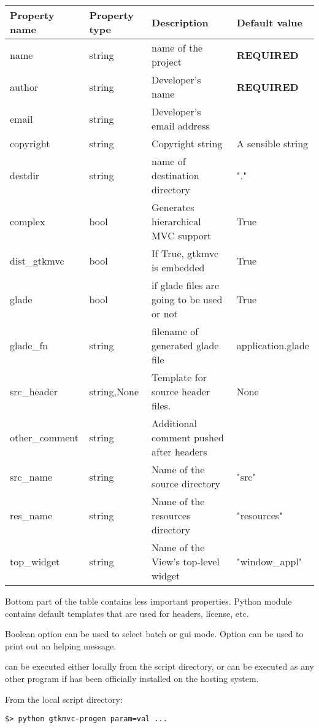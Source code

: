 \begin{center}
\begin{tabular}{|l|l|l|l|}
\hline
Property name& Property type & Description & Default value\\[0.5ex]
\hline
name & string & name of the project & \textbf{REQUIRED} \\
author & string & Developer's name & \textbf{REQUIRED} \\
email & string & Developer's email address & \\
copyright & string & Copyright string & A sensible string\\
destdir & string & name of destination directory & "." \\
complex & bool & Generates hierarchical MVC support & True \\
dist\_gtkmvc & bool & If True, gtkmvc is embedded & True \\
glade & bool & if glade files are going to be used or not & True \\
\hline
glade\_fn & string & filename of generated glade file & application.glade \\
src\_header & string,None & Template for source header files. & None \\
other\_comment & string & Additional comment pushed after headers &  \\ 
src\_name & string & Name of the source directory & "src" \\
res\_name & string & Name of the resources directory & "resources" \\
top\_widget & string & Name of the View's top-level widget & "window\_appl" \\
\hline
\end{tabular} 
\end{center}

Bottom part of the table contains less important properties. Python
module  contains default templates that
are used for headers, license, etc. 

Boolean option  can be used to select batch or gui
mode. Option  can be used to print out an helping message.

\bigskip

 can be executed either locally from the script
directory, or can be executed as any other program if \pygtkmvc has
been officially installed on the hosting system.

From the local script directory:
\begin{verbatim}
$> python gtkmvc-progen param=val ...
\end{verbatim}

